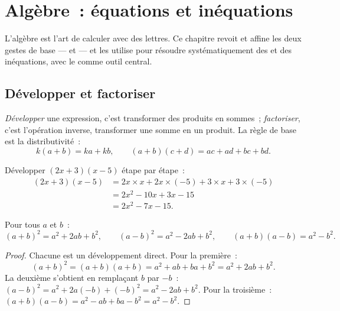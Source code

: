 \chapter{Algèbre~: équations et inéquations}\label{ch:g10:algebra}

L'algèbre est l'art de calculer avec des lettres. Ce chapitre revoit et
affine les deux gestes de base ---  et  --- et les
utilise pour résoudre systématiquement des  et des inéquations,
avec le  comme outil central.

\section{Développer et factoriser}

\begin{definition}\label{def:g10:algebra:expand}
\emph{Développer} une expression, c'est transformer des
produits en sommes~; \emph{factoriser}, c'est
l'opération inverse, transformer une somme en un produit. La règle de
base est la distributivité~:
\[
k(a + b) = ka + kb,
\qquad
(a + b)(c + d) = ac + ad + bc + bd .
\]
\end{definition}

\begin{example}\label{ex:g10:algebra:expand}
Développer $(2x + 3)(x - 5)$ étape par étape~:
\begin{align*}
(2x + 3)(x - 5)
&= 2x \times x + 2x \times (-5) + 3 \times x + 3 \times (-5) \\
&= 2x^2 - 10x + 3x - 15 \\
&= 2x^2 - 7x - 15 .
\end{align*}
\end{example}

\begin{theorem}\label{thm:g10:algebra:identities}
Pour tous  $a$ et $b$~:
\[
(a+b)^2 = a^2 + 2ab + b^2,
\qquad
(a-b)^2 = a^2 - 2ab + b^2,
\qquad
(a+b)(a-b) = a^2 - b^2 .
\]
\end{theorem}

\begin{proof}
Chacune est un développement direct. Pour la première~:
\[
(a+b)^2 = (a+b)(a+b) = a^2 + ab + ba + b^2 = a^2 + 2ab + b^2 .
\]
La deuxième s'obtient en remplaçant $b$ par $-b$~:
$(a-b)^2 = a^2 + 2a(-b) + (-b)^2 = a^2 - 2ab + b^2$. Pour la troisième~:
$(a+b)(a-b) = a^2 - ab + ba - b^2 = a^2 - b^2$.
\end{proof}

